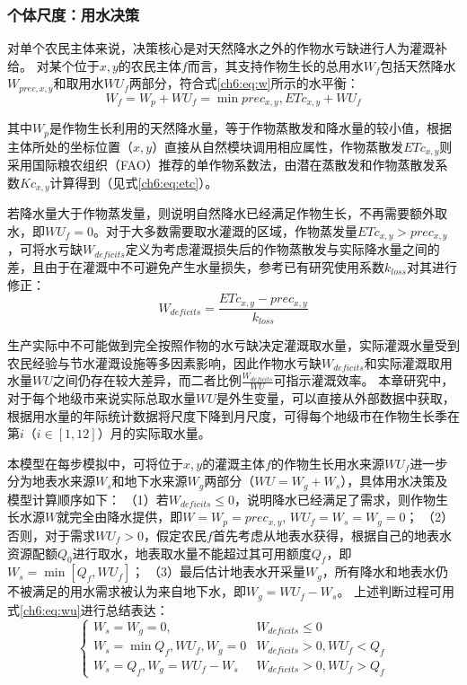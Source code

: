 \subsubsection{个体尺度：用水决策}

对单个农民主体来说，决策核心是对天然降水之外的作物水亏缺进行人为灌溉补给。
对某个位于$x, y$的农民主体$f$而言，其支持作物生长的总用水$W_f$包括天然降水$W_{prec, x, y}$和取用水$WU_f$两部分，符合式\ref{ch6:eq:w}所示的水平衡：
\begin{equation}
    \label{ch6:eq:w}
    W_f = W_{p} + WU_{f} = \min{prec_{x, y}, ETc_{x, y}} + WU_{f}
\end{equation}

其中$W_{p}$是作物生长利用的天然降水量，等于作物蒸散发和降水量的较小值，根据主体所处的坐标位置（$x, y$）直接从自然模块调用相应属性，作物蒸散发$ETc_{x, y}$则采用国际粮农组织（FAO）推荐的单作物系数法，由潜在蒸散发和作物蒸散发系数$Kc_{x, y}$计算得到（见式\ref{ch6:eq:etc}）。

若降水量大于作物蒸发量，则说明自然降水已经满足作物生长，不再需要额外取水，即$WU_{f} = 0$。对于大多数需要取水灌溉的区域，作物蒸发量$ETc_{x, y} > prec_{x, y}$，可将水亏缺$W_{deficits}$定义为考虑灌溉损失后的作物蒸散发与实际降水量之间的差，且由于在灌溉中不可避免产生水量损失，参考已有研究使用系数$k_{loss}$对其进行修正\cite{chen2023}：
\begin{equation}
    \label{ch6:eq:deficits}
    W_{deficits} = \frac{ETc_{x, y} - prec_{x, y}}{k_{loss}}
\end{equation}

生产实际中不可能做到完全按照作物的水亏缺决定灌溉取水量，实际灌溉水量受到农民经验与节水灌溉设施等多因素影响，因此作物水亏缺$W_{deficits}$和实际灌溉取用水量$WU$之间仍存在较大差异，而二者比例$\frac{W_{deficits}}{WU}$可指示灌溉效率。
本章研究中，对于每个地级市来说实际总取水量$WU$是外生变量，可以直接从外部数据中获取，根据用水量的年际统计数据将尺度下降到月尺度，可得每个地级市在作物生长季在第$i$（$i \in [1, 12]$）月的实际取水量。

本模型在每步模拟中，可将位于$x, y$的灌溉主体$f$的作物生长用水来源$WU_f$进一步分为地表水来源$W_s$和地下水来源$W_g$两部分（$WU = W_g + W_s$），具体用水决策及模型计算顺序如下：
（1）若$W_{deficits} \leq 0$，说明降水已经满足了需求，则作物生长水源$W$就完全由降水提供，即$W = W_p = prec_{x, y}$, $WU_f = W_{s} = W_{g} =0$；
（2）否则，对于需求$WU_f > 0$，假定农民$f$首先考虑从地表水获得，根据自己的地表水资源配额$Q_{0}$进行取水，地表取水量不能超过其可用额度$Q_f$，即$W_s = \min[Q_f, WU_f]$；
（3）最后估计地表水开采量$W_g$，所有降水和地表水仍不被满足的用水需求被认为来自地下水，即$W_g = WU_f - W_s$。
上述判断过程可用式\ref{ch6:eq:wu}进行总结表达：
\begin{equation}
    \label{ch6:eq:wu}
    \begin{cases}
        W_s = W_g = 0, & W_{deficits} \leq 0 \\
        W_s = \min{Q_f, WU_f}, W_g = 0 & W_{deficits} > 0, WU_f < Q_f \\
        W_s = Q_f, W_g = WU_f - W_s & W_{deficits} > 0, WU_f > Q_f
    \end{cases}
\end{equation}

